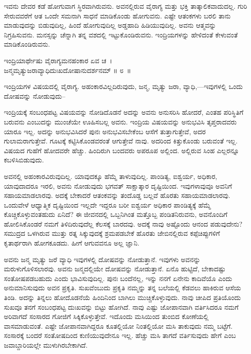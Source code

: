 ಇವನು ದೇವರ ಕಡೆ ಹೋಗುವಾಗ ಸ್ಥಿರವಾಗಿರುವನು. ಅವನಲ್ಲಿರುವ ವೈರಾಗ್ಯ ಮತ್ತು ಭಕ್ತಿ ತಾತ್ಕಾಲಿಕವಾದುದಲ್ಲ. ಗುರಿ ಸೇರುವವರೆಗೆ ಆತ ಒಂದೇ ಸಮನಾಗಿ ಸಾಧನೆ ಮಾಡಿಕೊಂಡು ಹೋಗುವನು. ಎಷ್ಟೇ ಆತಂಕಗಳು ಬರಲಿ ತಾನು ಮಾಡುವುದನ್ನು ಬಿಡುವುದಿಲ್ಲ, ಹಿಂದೆ ಹೋಗುವುದಿಲ್ಲ ಅಡ್ಡಹಾದಿ ಹಿಡಿಯುವುದಿಲ್ಲ. ಅವನು ಆತ್ಮವನ್ನು ನಿಗ್ರಹಿಸುವನು. ಮನಸ್ಸನ್ನು ಚೆನ್ನಾಗಿ ತನ್ನ ವಶದಲ್ಲಿ ಇಟ್ಟುಕೊಂಡಿರುವನು. ಇಂದ್ರಿಯಗಳನ್ನು ಹೇಳಿದಂತೆ ಕೇಳುವಂತೆ ಮಾಡಿಕೊಂಡಿರುವನು.

\begin{shloka}
ಇಂದ್ರಿಯಾರ್ಥೇಷು ವೈರಾಗ್ಯಮನಹಂಕಾರ ಏವ ಚ~।\\ಜನ್ಮಮೃತ್ಯುಜರಾವ್ಯಾಧಿದುಃಖದೋಷಾನುದರ್ಶನಮ್ \hfill॥ ೮~॥
\end{shloka}

\begin{artha}
ಇಂದ್ರಿಯಗಳ ವಿಷಯದಲ್ಲಿ ವೈರಾಗ್ಯ. ಅಹಂಕಾರವಿಲ್ಲದಿರುವುದು, ಜನ್ಮ, ಮೃತ್ಯು ಜರಾ, ವ್ಯಾಧಿ,—ಇವುಗಳಲ್ಲಿ ಒಂದು ದೋಷವನ್ನು ನೋಡುವುದು–
\end{artha}

ಇಂದ್ರಿಯಕ್ಕೆ ಸಂಬಂಧಪಟ್ಟ ವಿಷಯವನ್ನು ನೋಡಿದೊಡನೆ ಅದನ್ನು ಅವನು ಅನುಸರಿಸಿ ಹೋದರೆ, ಎಂತಹ ಪರಿಸ್ಥಿತಿಗೆ ಬರುವನು ಎಂಬುದನ್ನು ಮುಂಚೆಯೇ ಊಹಿಸಬಲ್ಲ ಅವನು. ಇಂದ್ರಿಯ ವಿಷಯವನ್ನು ಅನುಭವಿಸಿ ತೃಪ್ತರಾದವರು ಯಾರೂ ಇಲ್ಲ. ಅದನ್ನು ಅನುಭವಿಸಿದರೆ ಪುನಃ ಅನುಭವಿಸಬೇಕೆಂಬ ಆಸೆಗೆ ತುತ್ತಾಗುತ್ತೇವೆ, ಅದರ ಗುಲಾಮರಾಗುತ್ತೇವೆ. ಗೂಟಕ್ಕೆ ಕಟ್ಟಿಸಿಕೊಂಡವರಂತೆ ಆಗುತ್ತೇವೆ ನಾವು. ಅದರಿಂದ ಕಿತ್ತುಕೊಂಡು ಬರುವಂತೆ ಇಲ್ಲ. ವಿಷಯದ ಗುಹೆಗೆ ಹೋದವರೇ ಹೆಚ್ಚು. ಹಿಂದಿರುಗಿ ಬಂದವರು ಅಪರೂಪ ಅಲ್ಲಿಂದ. ಅಲ್ಲಿರುವ ಸಿಂಹ ಎಲ್ಲರನ್ನೂ ಕಬಳಿಸಿಬಿಡುವುದು.

ಅವನಲ್ಲಿ ಅಹಂಕಾರವಿರುವುದಿಲ್ಲ. ಯಾವುದಕ್ಕೂ ಹೆಮ್ಮೆ ತಾಳುವುದಿಲ್ಲ. ಪಾಂಡಿತ್ಯ, ಐಶ್ವರ್ಯ, ಅಧಿಕಾರ, ಯಾವುದಾದರೂ ಇರಲಿ, ಅವನು ನೋಡುವುದು ಭಗವತ್ ಸಾಕ್ಷಾತ್ಕಾರ ದೃಷ್ಟಿಯಿಂದ. ಇವುಗಳಾವುವೂ ಅವನಿಗೆ ಸಹಾಯಮಾಡಲಾರವು. ಅದಕ್ಕೆ ಬೇಕಾದರೆ ಆತಂಕವನ್ನು ತಂದೊಡ್ಡ ಬಲ್ಲವೆ ಹೊರತು ಸಹಾಯಮಾಡಲಾರವು. ಒಂದುವೇಳೆ ಆಧ್ಯಾತ್ಮಿಕ ದೃಷ್ಟಿಯಿಂದ ಇಲ್ಲದೇ ಇದ್ದರೂ ಬರೀ ಐಶ್ವರ್ಯ ಅಧಿಕಾರ ಪಾಂಡಿತ್ಯಕ್ಕೆ ಹೆಮ್ಮೆ ಕೊಚ್ಚಿಕೊಳ್ಳುವಂತಹುದು ಏನಿದೆ? ಈ ಜೀವನದಲ್ಲಿ ಒಬ್ಬನಿಗಿಂತ ಮತ್ತೊಬ್ಬ ಪಂಡಿತನಿರುವನು, ಅವನೊಂದಿಗೆ ಹೋಲಿಸಿ\-ಕೊಂಡರೆ ನಮಗೆ ತಿಳಿದಿರುವುದೆಲ್ಲ ಕೆಲಸಕ್ಕೆ ಬಾರದವು. ಅದಕ್ಕೆ ನಾವು ಅಷ್ಟೊಂದು ಆನಂದ ಪಡುವುದೇನು? ಸಮುದ್ರದ ಒಳಗಿರುವ ಮುತ್ತು ರತ್ನ ಸಿಕ್ಕುವುದಕ್ಕೆ ಶ್ರಮಪಡಬೇಕೆ ಹೊರತು ಜೇಬಿನಲ್ಲಿರುವ ಕಪ್ಪೆಚಿಪ್ಪುಗಳಿಗೆ ಕೃತಾರ್ಥರಾಗಿ ಹೋಗಕೂಡದು. ಹೀಗೆ ಆಗುವವನೂ ಅಲ್ಲ ಜ್ಞಾನಿ.

ಅವನು ಜನ್ಮ ಮೃತ್ಯು ಜರೆ ವ್ಯಾಧಿ ಇವುಗಳಲ್ಲಿ ದೋಷವನ್ನು ನೋಡುತ್ತಾನೆ. ಇವುಗಳು ಅವನನ್ನು ಮರುಳುಗೊಳಿಸಲಾರವು. ಅವನು ಜನ್ಮದಲ್ಲಿಯೇ ದೋಷವನ್ನು ನೋಡುತ್ತಾನೆ. ಏನೊ ಹುಟ್ಟಿದೆ, ಬೇಕಾದಷ್ಟು ಸಂತೋಷಪಡಬಹುದು ಎಂದು ಭಾವಿಸುವುದಿಲ್ಲ. ಪುನಃ ಬಂದೆನಲ್ಲ, ಇನ್ನು ನನಗೆ ಏನೇನು ಕಾದಿವೆಯೊ ಎಂದು ಅನುಮಾನಿಸುವುದು ಅವನ ಪ್ರಕೃತಿ. ಸುಖವೆಂಬುದು ಪ್ರಕೃತಿ ನಮ್ಮನ್ನು ತನ್ನ ಬಲೆಯಲ್ಲಿ ಕೆಡವಲು ಹಾಕಿರುವ ಆಸೆಯ ತಿಂಡಿ. ಅದನ್ನು ತಿನ್ನಲು ಹೋದೊಡನೆಯೆ ಹಿಂದಿನಿಂದ ಬಾಗಿಲು ಮುಚ್ಚಿಕೊಳ್ಳುವುದು. ನಾವು ಚೀಪಿದ ಪ್ರತಿಯೊಂದು ಸುಖವೂ ತನಗೆ ಸಂಬಂಧಪಟ್ಟ ದುಃಖವನ್ನು ಬಿಟ್ಟು ಹೋಗಿದೆ. ನಾವು ಎಷ್ಟು ಜೋಪಾನವಾಗಿ ವರ್ತಿಸಿದರೂ ನಮಗೆ ಅರಿವಾಗದೆ ಸಂಸಾರದ ಗೋಜಿಗೆ ಸಿಕ್ಕಿಕೊಳ್ಳುತ್ತೇವೆ. ಇದೊಂದು ಮಸಿಯಿಂದ ತುಂಬಿದ ಕೋಣೆಯಲ್ಲಿ ವಾಸಮಾಡುವಂತೆ. ಎಷ್ಟೇ ಜೋಪಾನವಾಗಿದ್ದರೂ ಕೂತಲ್ಲಿಯೋ ನಿಂತಲ್ಲಿಯೋ ಮಸಿ ತಾಕುವುದು ನಮ್ಮ ಬಟ್ಟೆಗೆ. ಸಂಸಾರಕ್ಕೆ ಬಂದರೆ ಸಂತೋಷದಿಂದ ಕುಣಿಯುವು\-ದೇನೂ ಇಲ್ಲ. ಹೆಚ್ಚು ಮಸಿ ತಾಗದೆ ವರ್ತಿಸುವುದು ಹೇಗೆ ಎಂಬ ಜವಾಬ್ದಾರಿಯಲ್ಲೇ ಮುಳುಗಿರ\-ಬೇಕಾಗಿದೆ.


